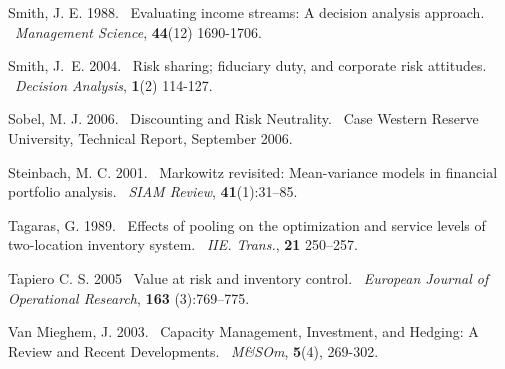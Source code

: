 \documentclass[mnsc,nonblindrev,copyedit]{informs2_wz} %
\def\newblock{\ }%
\newcommand{\OUT}[1]{}
\begin{document}
\begin{thebibliography}{1}
Smith, J. E. 1988.
\newblock Evaluating income streams: A decision analysis approach.
\newblock {\em Management Science}, {\bf 44}(12) 1690-1706.

Smith, J.~E. 2004.
\newblock Risk sharing; fiduciary duty, and corporate risk attitudes.
\newblock {\em Decision Analysis}, {\bf 1}(2) 114-127.

Sobel, M. J. 2006.
\newblock Discounting and Risk Neutrality.
\newblock Case Western Reserve University, Technical Report, September 2006.

Steinbach, M. C. 2001.
\newblock Markowitz revisited: Mean-variance models in financial portfolio
  analysis.
\newblock {\em SIAM Review}, {\bf 41}(1):31--85.

Tagaras, G. 1989.
\newblock Effects of pooling on the optimization and service levels of
  two-location inventory system.
\newblock {\em IIE. Trans.}, {\bf 21} 250--257.

Tapiero C. S. 2005
\newblock Value at risk and inventory control.
\newblock {\em European Journal of Operational Research}, {\bf 163} (3):769--775.


Van Mieghem, J. 2003.
\newblock {Capacity Management, Investment, and Hedging: A Review and Recent Developments.}
\newblock {\em M\&SOm}, {\bf 5}(4), 269-302.

\end{thebibliography}

%
%

\ECSwitch

\ECDisclaimer


\OUT{
\newpage

\setcounter{page}{1}


\section*{On-Line Appendix}
}
\end{document}
